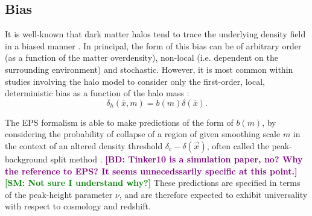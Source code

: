 \documentclass[5p]{elsarticle}
\newcommand{\bd}[1]{\textcolor{purple}{\textbf{[BD: #1]}}}
\newcommand{\sgm}[1]{\textcolor{green}{\textbf{[SM: #1]}}}
\begin{document}




\subsection{Bias}
\label{sec:biastheory}
It is well-known that dark matter halos tend to trace the underlying density field in a biased manner \citep[eg.]{Cole1989}. In principal, the form of this bias can be of arbitrary order (as a function of the matter overdensity), non-local (i.e. dependent on the surrounding environment) and stochastic. However, it is most common within studies involving the halo model to consider only the first-order, local, deterministic bias as a function of the halo mass \citep{Mo1996}: 
\begin{equation}
    \delta_h(\bar{x},m) = b(m) \delta(\bar{x}).
\end{equation}

The EPS formalism is able to make predictions of the form of $b(m)$, by considering the probability of collapse of a region of given smoothing scale $m$ in the context of an altered density threshold $\delta_c - \delta(\vec{x})$, often called the peak-background split method \citep[for more details, see eg.][]{Bond1991,Zentner2007,Tinker2010,Manera2010}. \bd{Tinker10 is a simulation paper, no? Why the reference to EPS? It seems unnecedssarily specific at this point.} \sgm{Not sure I understand why?} These predictions are specified in terms of the peak-height parameter $\nu$, and are therefore expected to exhibit universality with respect to cosmology and redshift.
\end{document}
